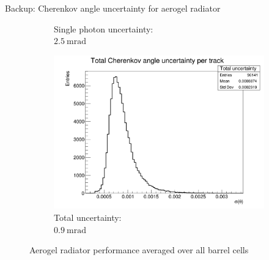 \documentclass{beamer}
\begin{document}
\begin{frame}{Backup: Cherenkov angle uncertainty for aerogel radiator}
\begin{figure}
\begin{subfigure}{0.35\textwidth}
      \caption{Single photon uncertainty:\\ $\SI{2.5}{\milli\radian}$}
    \end{subfigure}%
    \begin{subfigure}{0.35\textwidth}
      \includegraphics[width = 1.0\textwidth]{Plots/TotalCherenkovUncertainty_Barrel_Aerogel.png}
      \vspace{-0.75cm}
      \caption{Total uncertainty:\\ $\SI{0.9}{\milli\radian}$}
    \end{subfigure}
    \vspace{-0.1cm}
    \caption{Aerogel radiator performance averaged over all barrel cells}
  \end{figure}
\end{frame}
\end{document}
